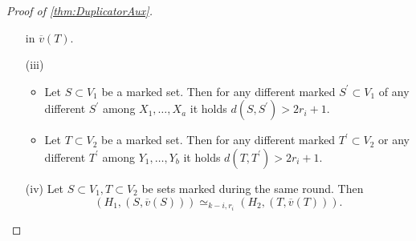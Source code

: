 \documentclass[12pt,notitlepage,a4paper]{article}
\theoremstyle{definition}
\begin{document}
\begin{proof}[Proof of \cref{thm:DuplicatorAux}]
\begin{itemize}
		in $\overline{v}(T)$.
		\item[(iii)] 
			\begin{itemize}
			\item  Let $S\subset V_1$ be a marked set. Then 
			for any different marked $S^\prime \subset V_1$ 
			of any different $S^\prime$ among $X_1,\dots,X_a$
			it holds $d(S,S^\prime)>2r_i + 1$. 
			\item Let $T\subset V_2$ be a marked set. Then
			for any different marked $T^\prime \subset V_2$
			or any different $T^\prime$ among
			$Y_1,\dots, Y_b$  it holds $d(T,T^\prime)>2r_i +1$.
			\end{itemize}
		\item[(iv)] Let $S\subset V_1, T\subset V_2$ be sets
		marked during the same round. Then
		\[
		\left(H_1, (S,\overline{v}(S))\right)\simeq_{k-i,r_i}
		\left(H_2, (T,\overline{v}(T))\right).	\]
					

\end{itemize}
\end{proof}
\end{document}
